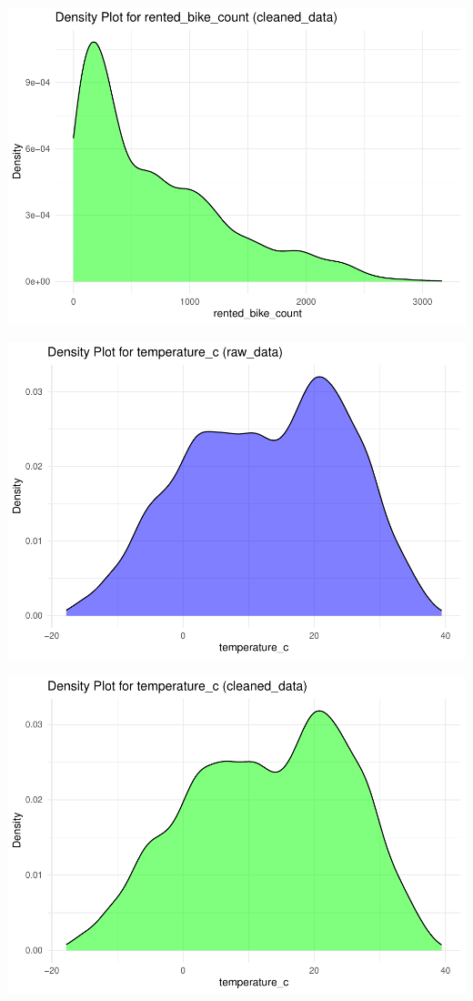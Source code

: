 \documentclass[
  11pt,
  letterpaper,
]{article}
\begin{document}
\begin{center}\includegraphics[width=1.2\linewidth,]{Final_Project_files/figure-latex/unnamed-chunk-15-2} \end{center}

\begin{center}\includegraphics[width=1.2\linewidth,]{Final_Project_files/figure-latex/unnamed-chunk-15-3} \end{center}

\begin{center}\includegraphics[width=1.2\linewidth,]{Final_Project_files/figure-latex/unnamed-chunk-15-4} \end{center}
\end{document}
